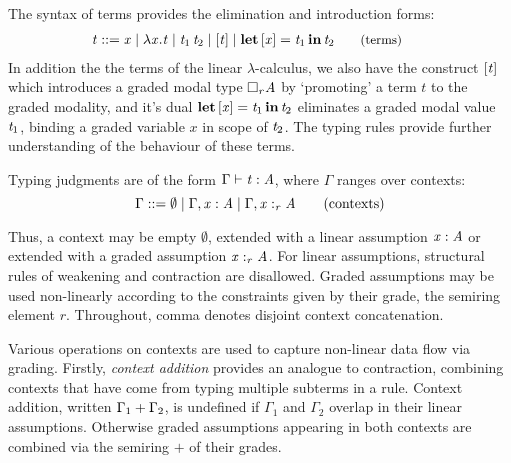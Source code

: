 The syntax of terms provides the elimination and introduction forms:
\begin{align*}
\hspace{-0.8em} \mathit{t} ::= \;
       & \mathit{x}
  \mid \lambda  \mathit{x}  .  \mathit{t}
  \mid \mathit{t_{{\mathrm{1}}}} \, \mathit{t_{{\mathrm{2}}}}
  \mid [  \mathit{t}  ]
  \mid \textbf{let} \, [  \mathit{x}  ] =  \mathit{t_{{\mathrm{1}}}}  \, \textbf{in} \,  \mathit{t_{{\mathrm{2}}}}
{\small{\tag{terms}}}
\end{align*}
In addition the the terms of the linear $\lambda$-calculus, we also have the
construct $[  \mathit{t}  ]$ which introduces a graded modal type $\Box_{  \mathit{r}  }  \mathit{A}$ by `promoting' a term $t$ to the graded modality, and it's dual $\textbf{let} \, [  \mathit{x}  ] =  \mathit{t_{{\mathrm{1}}}}  \, \textbf{in} \,  \mathit{t_{{\mathrm{2}}}}$ eliminates a graded modal value $\mathit{t_{{\mathrm{1}}}}$, binding a graded variable $x$
in scope of $\mathit{t_{{\mathrm{2}}}}$. The typing rules provide further understanding of the
behaviour of these terms.

Typing judgments are of the form $\Gamma  \vdash  \mathit{t}  :  \mathit{A}$, where $\Gamma$ ranges over contexts:
\begin{equation*}
  \Gamma ::= \emptyset
  \mid \Gamma  \GRANULEsym{,}   \GRANULEmv{x}  :  \GRANULEnt{A}
  \mid \Gamma  \GRANULEsym{,}   \GRANULEmv{x}  :_{\textcolor{coeffectColor}{  \GRANULEnt{r}  } }   \GRANULEnt{A}
\tag{contexts}
\end{equation*}

Thus, a context may be empty $\emptyset$, extended with a
linear assumption $\mathit{x}  :  \mathit{A}$ or extended with a graded assumption $\GRANULEmv{x}  :_{\textcolor{coeffectColor}{  \GRANULEnt{r}  } }   \GRANULEnt{A}$. For linear assumptions, structural rules of weakening
and contraction are disallowed. Graded assumptions may be used
non-linearly according to the constraints given by their grade, the
semiring element $r$. Throughout, comma denotes disjoint context
concatenation.

Various operations on contexts are used to capture non-linear data flow
via grading. Firstly, \emph{context addition} provides an
analogue to contraction, combining contexts that have come from
typing multiple subterms in a rule.
Context addition, written $\Gamma_{{\mathrm{1}}}  +  \Gamma_{{\mathrm{2}}}$, is undefined if $\Gamma_{{\mathrm{1}}}$ and $\Gamma_{{\mathrm{2}}}$
overlap in their linear assumptions. Otherwise graded assumptions appearing
in both contexts are combined via the semiring $+$ of their grades.


